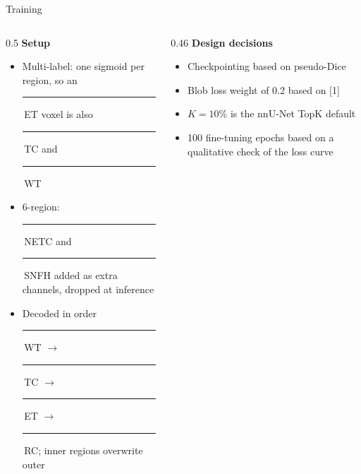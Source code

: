 \documentclass[aspectratio=169,11pt]{beamer}
\newcommand{\lab}[1]{{\color{c#1}\rule{0.6em}{0.6em}}\,#1}
\newcommand{\slideref}{}
\begin{document}
{\renewcommand{\slideref}{[1] S.\,S.~Kundu \emph{et al.}, ``Instance awareness of multi-class semantic segmentation loss functions,'' arXiv:2604.24276, 2026.}
\begin{frame}{Training}
\begin{columns}[t]
\begin{column}{0.5\textwidth}
{\small\bfseries Setup}\\[0.6em]
\begin{itemize}\setlength\itemsep{1.1em}\footnotesize
  \item Multi-label: one sigmoid per region, so an \lab{ET} voxel is also \lab{TC} and \lab{WT}
  \item 6-region: \lab{NETC} and \lab{SNFH} added as extra channels, dropped at inference
  \item Decoded in order \lab{WT} $\rightarrow$ \lab{TC} $\rightarrow$ \lab{ET} $\rightarrow$ \lab{RC}; inner regions overwrite outer
\end{itemize}
\end{column}
\begin{column}{0.46\textwidth}
{\small\bfseries Design decisions}\\[0.6em]
\begin{itemize}\setlength\itemsep{1.1em}\footnotesize
  \item Checkpointing based on pseudo-Dice
  \item Blob loss weight of 0.2 based on [1]
  \item $K=10\%$ is the nnU-Net TopK default
  \item 100 fine-tuning epochs based on a qualitative check of the loss curve
\end{itemize}
\end{column}
\end{columns}
\end{frame}
}
\end{document}
